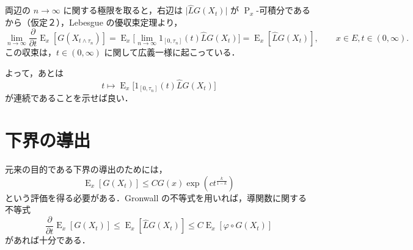 \documentclass[
]{article}
\begin{document}
\begin{tcolorbox}
両辺の \(n\to\infty\) に関する極限を取ると，右辺は
\(\lvert\widehat{L}G(X_t)\rvert\) が
\(\operatorname{P}_x\)-可積分であるから（仮定２），Lebesgue
の優収束定理より， \[
\lim_{n\to\infty}\frac{\partial }{\partial t}\operatorname{E}_x[G(X_{t\land\tau_n})]=\operatorname{E}_x\biggl[\lim_{n\to\infty}1_{[0,\tau_n]}(t)\widehat{L}G(X_t)\biggr]=\operatorname{E}_x[\widehat{L}G(X_t)],\qquad x\in E,t\in(0,\infty).
\] この収束は，\(t\in(0,\infty)\)
に関して広義一様に起こっている．\footnotemark{}

よって，あとは \[
t\mapsto \operatorname{E}_x\biggl[1_{[0,\tau_n]}(t)\widehat{L}G(X_t)\biggr]
\] が連続であることを示せば良い．

\end{tcolorbox}



\section{下界の導出}\label{ux4e0bux754cux306eux5c0eux51fa}

元来の目的である下界の導出のためには， \[
\operatorname{E}_x[G(X_t)]\le CG(x)\exp\left(ct^{\frac{k}{1-k}}\right)
\] という評価を得る必要がある．Gronwall
の不等式を用いれば，導関数に関する不等式 \[
\frac{\partial }{\partial t}\operatorname{E}_x[G(X_t)]\le\operatorname{E}_x[\widehat{L}G(X_t)]\le C\operatorname{E}_x[\varphi\circ G(X_t)]
\] があれば十分である．
\end{document}
